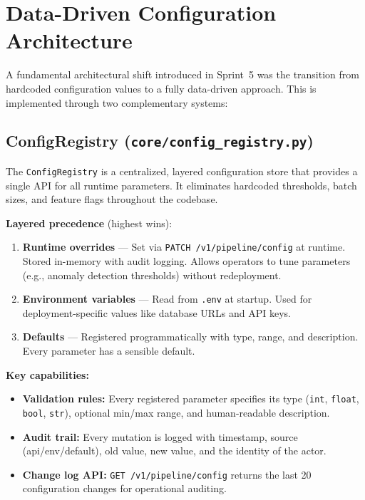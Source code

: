 \documentclass[12pt,a4paper,twoside]{report}
\begin{document}
\section{Data-Driven Configuration Architecture}
\label{sec:config-arch}

A fundamental architectural shift introduced in Sprint~5 was the transition from hardcoded configuration values to a fully data-driven approach. This is implemented through two complementary systems:

\subsection{ConfigRegistry (\texttt{core/config\_registry.py})}

The \texttt{ConfigRegistry} is a centralized, layered configuration store that provides a single API for all runtime parameters. It eliminates hardcoded thresholds, batch sizes, and feature flags throughout the codebase.

\textbf{Layered precedence} (highest wins):
\begin{enumerate}
  \item \textbf{Runtime overrides} --- Set via \texttt{PATCH /v1/pipeline/config} at runtime. Stored in-memory with audit logging. Allows operators to tune parameters (e.g., anomaly detection thresholds) without redeployment.
  \item \textbf{Environment variables} --- Read from \texttt{.env} at startup. Used for deployment-specific values like database URLs and API keys.
  \item \textbf{Defaults} --- Registered programmatically with type, range, and description. Every parameter has a sensible default.
\end{enumerate}

\textbf{Key capabilities:}
\begin{itemize}
  \item \textbf{Validation rules:} Every registered parameter specifies its type (\texttt{int}, \texttt{float}, \texttt{bool}, \texttt{str}), optional min/max range, and human-readable description.
  \item \textbf{Audit trail:} Every mutation is logged with timestamp, source (api/env/default), old value, new value, and the identity of the actor.
  \item \textbf{Change log API:} \texttt{GET /v1/pipeline/config} returns the last 20 configuration changes for operational auditing.
\end{itemize}
\end{document}
